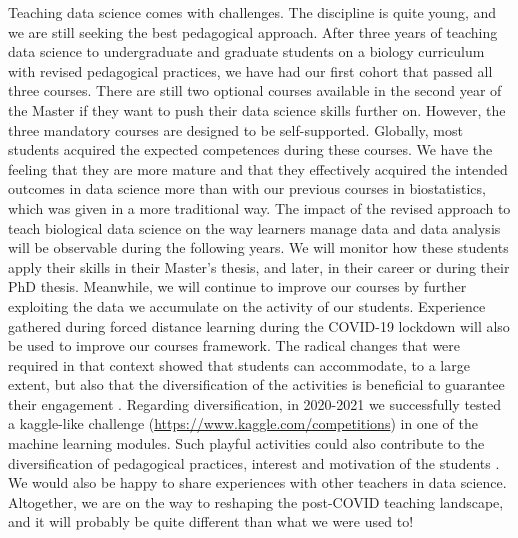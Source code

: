 \documentclass{aims}
\theoremstyle{definition}
\begin{document}
Teaching data science comes with challenges. The discipline is quite
young, and we are still seeking the best pedagogical approach. After
three years of teaching data science to undergraduate and graduate
students on a biology curriculum with revised pedagogical practices, we
have had our first cohort that passed all three courses. There are still
two optional courses available in the second year of the Master if they
want to push their data science skills further on. However, the three
mandatory courses are designed to be self-supported. Globally, most
students acquired the expected competences during these courses. We have
the feeling that they are more mature and that they effectively acquired
the intended outcomes in data science more than with our previous
courses in biostatistics, which was given in a more traditional way. The
impact of the revised approach to teach biological data science on the
way learners manage data and data analysis will be observable during the
following years. We will monitor how these students apply their skills
in their Master's thesis, and later, in their career or during their PhD
thesis. Meanwhile, we will continue to improve our courses by further
exploiting the data we accumulate on the activity of our students.
Experience gathered during forced distance learning during the COVID-19
lockdown will also be used to improve our courses framework. The radical
changes that were required in that context showed that students can
accommodate, to a large extent, but also that the diversification of the
activities is beneficial to guarantee their engagement
\cite{Spadafora2018, Young2002}. Regarding diversification, in 2020-2021
we successfully tested a kaggle-like challenge
(\url{https://www.kaggle.com/competitions}) in one of the machine
learning modules. Such playful activities could also contribute to the
diversification of pedagogical practices, interest and motivation of the
students \cite{Alonso2019}. We would also be happy to share experiences
with other teachers in data science. Altogether, we are on the way to
reshaping the post-COVID teaching landscape, and it will probably be
quite different than what we were used to!

\end{document}
